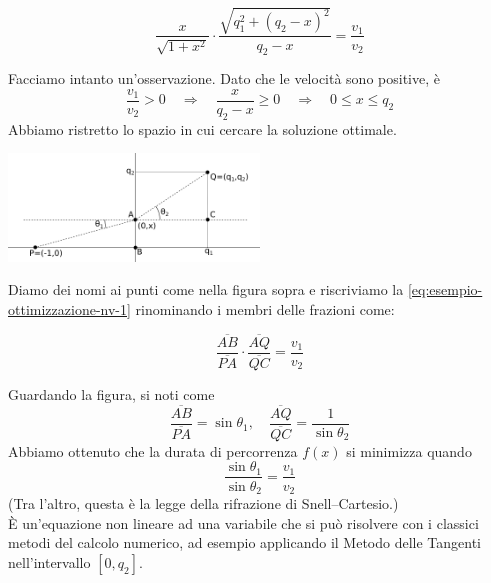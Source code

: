 \begin{example}
\begin{equation}
\label{eq:esempio-ottimizzazione-nv-1} \frac{x}{\sqrt{1+x^2}} \cdot
\frac{\sqrt{q_1^2 + (q_2-x)^2}}{q_2 -x} =\frac{v_1}{v_2}
\end{equation}

Facciamo intanto un'osservazione. Dato che le velocit\`a sono positive,
\`e
$$\frac{v_1}{v_2} > 0 \quad \Longrightarrow \quad \frac{x}{q_2-x} \geq 0 \quad \Longrightarrow \quad 0 \leq x \leq q_2$$
Abbiamo ristretto lo spazio in cui cercare la soluzione ottimale.

\centerline{\includegraphics[width=0.50\textwidth]{imgs/esempio-prog-nv2.png}}

Diamo dei nomi ai punti come nella figura sopra e riscriviamo la
\ref{eq:esempio-ottimizzazione-nv-1} rinominando i membri delle
frazioni come:

$$\frac{\overline{AB}}{\overline{PA}} \cdot \frac{\overline{AQ}}{\overline{QC}} = \frac{v_1}{v_2}$$

Guardando la figura, si noti come
$$\frac{\overline{AB}}{\overline{PA}} = \sin \theta_1, \quad \frac{\overline{AQ}}{\overline{QC}} = \frac{1}{\sin \theta_2}$$
Abbiamo ottenuto che la durata di percorrenza $f(x)$ si minimizza
quando
$$ \frac{\sin \theta_1}{\sin \theta_2} = \frac{v_1}{v_2}$$
(Tra l'altro, questa \`e la legge della rifrazione di
Snell--Cartesio.)\\ \`E un'equazione non lineare ad una variabile che si
può risolvere con i classici metodi del calcolo numerico, ad esempio
applicando il Metodo delle Tangenti nell'intervallo $[0, q_2]$.
\end{example}

